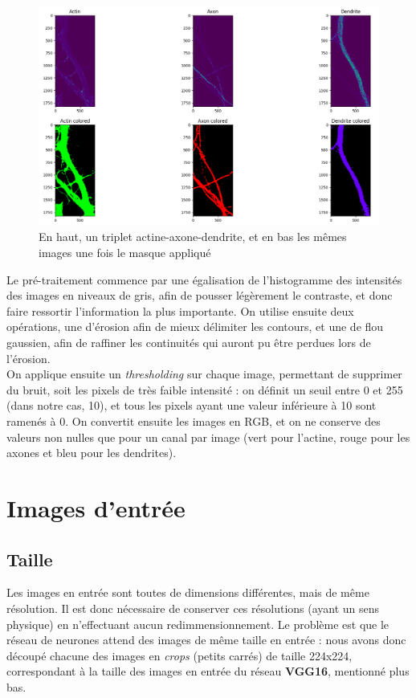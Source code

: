 \documentclass{report}
\begin{document}
\begin{figure}[H]
\centering
\includegraphics[scale=0.35]{"ex_mask"}
\caption{En haut, un triplet actine-axone-dendrite, et en bas les mêmes images une fois le masque appliqué}
\end{figure}

Le pré-traitement commence par une égalisation de l'histogramme des intensités
des images en niveaux de gris, afin de pousser légèrement le contraste, et donc faire
ressortir l'information la plus importante. On utilise ensuite deux opérations, une d'érosion
afin de mieux délimiter les contours, et une de flou gaussien,
afin de raffiner les continuités qui auront pu être perdues lors de l'érosion. \\
On applique ensuite un \textit{thresholding} sur chaque image,
permettant de supprimer du bruit, soit les pixels de très faible intensité :
on définit un seuil entre 0 et 255 (dans notre cas, 10), et tous les pixels ayant
une valeur inférieure à 10 sont ramenés à 0. On convertit ensuite les images en
RGB, et on ne conserve des valeurs non nulles que pour un canal par image (vert pour
l'actine, rouge pour les axones et bleu pour les dendrites).

\section{Images d'entrée}

\subsection{Taille}

Les images en entrée sont toutes de dimensions différentes, mais de même résolution.
Il est donc nécessaire de conserver ces résolutions (ayant un sens physique) en
n'effectuant aucun redimmensionnement. Le problème est que le réseau de neurones
attend des images de même taille en entrée : nous avons donc découpé chacune des
images en \textit{crops} (petits carrés) de taille 224x224, correspondant à la taille
des images en entrée du réseau \textbf{VGG16}, mentionné plus bas.
\end{document}
